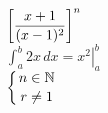 \documentclass{article} %
\newcommand{\N}{\mathbb{N}}
\begin{document}
$\displaystyle \left[{x+1 \over (x-1)^2} \right]^n$ \\

$\int_{a}^{b}2x\, dx = \left. x^2 \right|_{a}^{b}$\\

$\displaystyle \left\{ {n \in \N \atop r \neq 1 } \right.$\\
\end{document}
